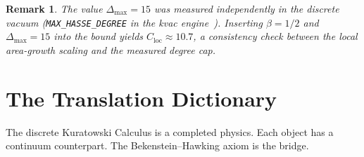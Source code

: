 \documentclass[11pt]{article}
\newtheorem{remark}[theorem]{Remark}
\begin{document}
\begin{remark}
The value $\Delta_{\max} = 15$ was measured independently
in the discrete vacuum (\texttt{MAX\_HASSE\_DEGREE} in the
kvac engine~\cite{SilvaAlvarado26}).  Inserting $\beta = 1/2$
and $\Delta_{\max} = 15$ into the bound yields
$C_{\mathrm{loc}} \approx 10.7$, a consistency check between
the local area-growth scaling and the measured degree cap.
\end{remark}

\section{The Translation Dictionary}
\label{sec:dictionary}

The discrete Kuratowski Calculus is a completed physics.
Each object has a continuum counterpart.  The Bekenstein--Hawking
axiom is the bridge.
\end{document}
